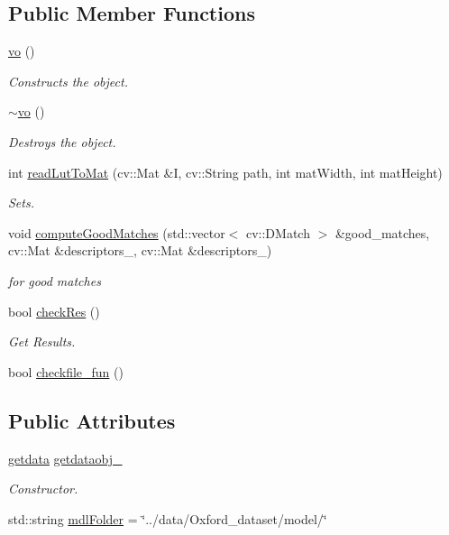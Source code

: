 \subsection*{Public Member Functions}
\begin{DoxyCompactItemize}
\item 
\hyperlink{classvo_a572a78091387cd798dbb61eb76fc7c19}{vo} ()
\begin{DoxyCompactList}\small\item\em Constructs the object. \end{DoxyCompactList}\item 
\hyperlink{classvo_a3ecdcb7d44c7d1f2972bb5cbf0e2f55f}{$\sim$vo} ()
\begin{DoxyCompactList}\small\item\em Destroys the object. \end{DoxyCompactList}\item 
int \hyperlink{classvo_a33defbce61461f3af27ea2d16d908266}{read\+Lut\+To\+Mat} (cv\+::\+Mat \&I, cv\+::\+String path, int mat\+Width, int mat\+Height)
\begin{DoxyCompactList}\small\item\em Sets. \end{DoxyCompactList}\item 
void \hyperlink{classvo_ade4e64203a99ab3760f15c2af3449ba4}{compute\+Good\+Matches} (std\+::vector$<$ cv\+::\+D\+Match $>$ \&good\+\_\+matches, cv\+::\+Mat \&descriptors\+\_, cv\+::\+Mat \&descriptors\+\_)
\begin{DoxyCompactList}\small\item\em for good matches \end{DoxyCompactList}\item 
bool \hyperlink{classvo_a870e05250f7bea1f438bee3f68e3e7a4}{check\+Res} ()
\begin{DoxyCompactList}\small\item\em Get Results. \end{DoxyCompactList}\item 
bool \hyperlink{classvo_a326b991afda611a12fccfbdb54c5273e}{checkfile\+\_\+fun} ()
\end{DoxyCompactItemize}
\subsection*{Public Attributes}
\begin{DoxyCompactItemize}
\item 
\hyperlink{classgetdata}{getdata} \hyperlink{classvo_ac42f9a37e2a255371ae0641561b80de5}{getdataobj\+\_\+}
\begin{DoxyCompactList}\small\item\em Constructor. \end{DoxyCompactList}\item 
std\+::string \hyperlink{classvo_a6cec8c62c2984586bece5102f2d55d02}{mdl\+Folder} = \char`\"{}../data/Oxford\+\_\+dataset/model/\char`\"{}
\end{DoxyCompactItemize}



